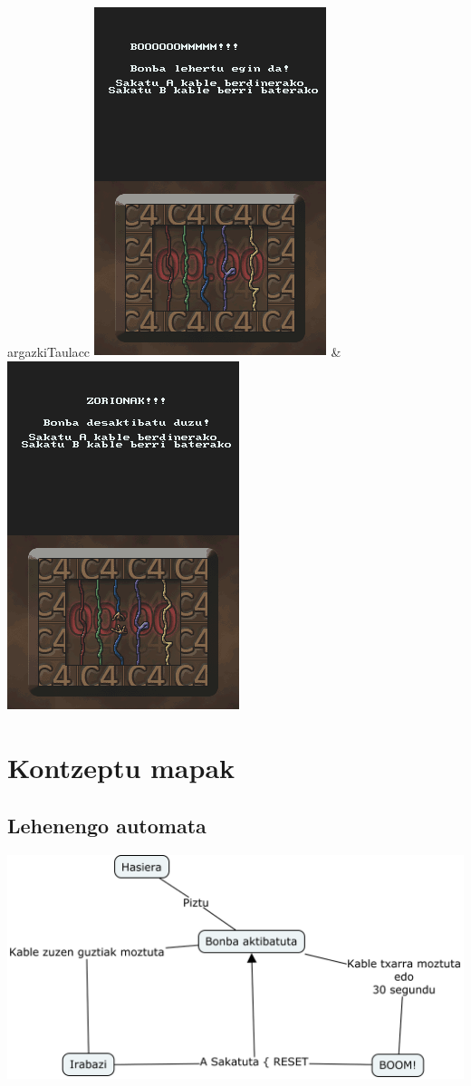 \documentclass[dvipsnames]{../../../../AritzhClass}
\begin{document}
\begin{taula}{}{argazkiTaula}{cc}
\includegraphics[scale=0.75]{Jokoa3} & \includegraphics[scale=0.75]{Jokoa4}
\end{taula}

\section{Kontzeptu mapak}

\subsection{Lehenengo automata}

\begin{center}\includegraphics[scale=0.25]{Bonba_mapa}\end{center}
\end{document}
